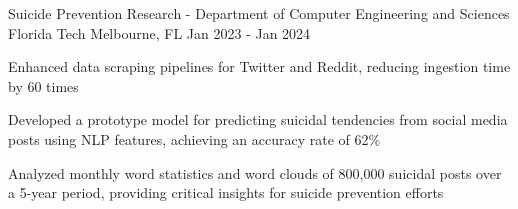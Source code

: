 
\begin{cventries}
    \cventry
    {Suicide Prevention Research - Department of Computer Engineering and Sciences}
    {Florida Tech}
    {Melbourne, FL}
    {Jan 2023 - Jan 2024}
    {\begin{cvitems}
            \item {Enhanced data scraping pipelines for Twitter and Reddit, reducing ingestion time by 60 times}
            \item {Developed a prototype model for predicting suicidal tendencies from social media posts using NLP features, achieving an accuracy rate of 62\%}
            \item {Analyzed monthly word statistics and word clouds of 800,000 suicidal posts over a 5-year period,  providing critical insights for suicide prevention efforts}
        \end{cvitems}}
\end{cventries}